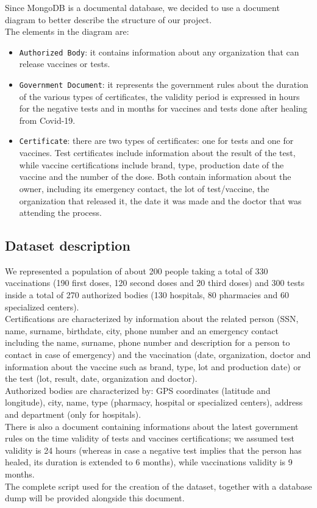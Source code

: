\documentclass[12pt, a4paper]{article}
\begin{document}
\noindent 
Since MongoDB is a documental database, we decided to use a document diagram to better
describe the structure of our project. \\
The elements in the diagram are:
\begin{itemize}
    \item \texttt{Authorized Body}: it contains information about any organization that
        can release vaccines or tests.
    \item \texttt{Government Document}: it represents the government rules about the 
        duration of the various types of certificates, the validity period is expressed
        in hours for the negative tests and in months for vaccines and tests done after 
        healing from Covid-19.
    \item \texttt{Certificate}: there are two types of certificates: one for tests and 
        one for vaccines. Test certificates include information about the result of the 
        test, while vaccine certifications include brand, type, production date of the 
        vaccine and the number of the dose. Both contain information about the owner, 
        including its emergency contact, the lot of test/vaccine, the organization that 
        released it, the date it was made and the doctor that was attending the process.

\end{itemize}
\subsection{Dataset description}

We represented a population of about 200 people taking a total of 330 vaccinations
(190 first doses, 120 second doses and 20 third doses) and 300 tests inside
a total of 270 authorized bodies (130 hospitals, 80 pharmacies and 60 
specialized centers). \\
Certifications are characterized by information about the related person
(SSN, name, surname, birthdate, city, phone number and an emergency contact
including the name, surname, phone number and description for a person to 
contact in case of emergency) and the vaccination (date, organization, doctor 
and information about the vaccine such as brand, type, lot and production 
date) or the test (lot, result, date, organization and doctor). \\
Authorized bodies are characterized by: GPS coordinates (latitude and longitude), city,
name, type (pharmacy, hospital or specialized centers), address and department 
(only for hospitals). \\
There is also a document containing informations about the latest government rules
on the time validity of tests and vaccines certifications; we assumed test validity is 
24 hours (whereas in case a negative test implies that the person has healed, its 
duration is extended to 6 months), while vaccinations validity is 9 months. \\
The complete script used for the creation of the dataset, together with a 
database dump will be provided alongside this document.
\end{document}
